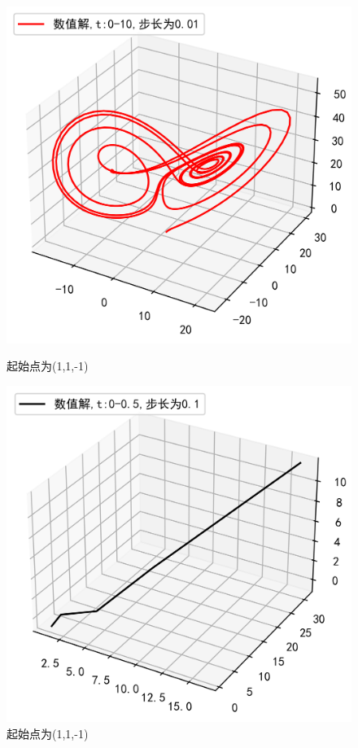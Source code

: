 \documentclass[a4paper]{article}%
\begin{document}
\begin{figure}[h]
    \begin{minipage}[h]{0.48\linewidth}
    \centering
    \includegraphics[scale=0.65]{23}
    \caption{起始点为(1,1,-1)}
    \end{minipage}
    \begin{minipage}[h]{0.48\linewidth}
    \centering
    \includegraphics[scale=0.65]{24}
    \caption{起始点为(1,1,-1)}
    \end{minipage}
\end{figure}
\end{document}
